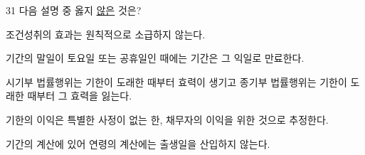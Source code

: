 \begin{question}{31}
다음 설명 중 옳지 \uline{않은} 것은?
\begin{choices}
  \item 조건성취의 효과는 원칙적으로 소급하지 않는다.
  \item 기간의 말일이 토요일 또는 공휴일인 때에는 기간은 그 익일로 만료한다.
  \item 시기부 법률행위는 기한이 도래한 때부터 효력이 생기고 종기부 법률행위는 기한이 도래한 때부터 그 효력을 잃는다.
  \item 기한의 이익은 특별한 사정이 없는 한, 채무자의 이익을 위한 것으로 추정한다.
  \item 기간의 계산에 있어 연령의 계산에는 출생일을 산입하지 않는다.
\end{choices}
\end{question}
